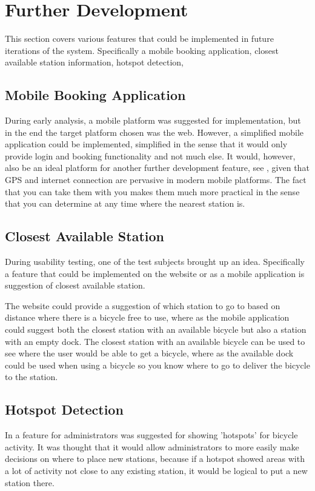\section{Further Development}
This section covers various features that could be implemented in future iterations of the system. Specifically a mobile booking application, closest available station information, hotspot detection,

\subsection{Mobile Booking Application}
During early analysis, a mobile platform was suggested for implementation, but in the end the target platform chosen was the web. 
However, a simplified mobile application could be implemented, simplified in the sense that it would only provide login and booking functionality and not much else.
It would, however, also be an ideal platform for another further development feature, see , given that GPS and internet connection are pervasive in modern mobile platforms.
The fact that you can take them with you makes them much more practical in the sense that you can determine at any time where the nearest station is.

\subsection{Closest Available Station}\label{subsec:closeststation}
During usability testing, one of the test subjects brought up an idea.
Specifically a feature that could be implemented on the website or as a mobile application is suggestion of closest available station.

The website could provide a suggestion of which station to go to based on distance where there is a bicycle free to use, where as the mobile application could suggest both the closest station with an available bicycle but also a station with an empty dock.
The closest station with an available bicycle can be used to see where the user would be able to get a bicycle, where as the available dock could be used when using a bicycle so you know where to go to deliver the bicycle to the station.

\subsection{Hotspot Detection}
In  a feature for administrators was suggested for showing 'hotspots' for bicycle activity. 
It was thought that it would allow administrators to more easily make decisions on where to place new stations, because if a hotspot showed areas with a lot of activity not close to any existing station, it would be logical to put a new station there.

